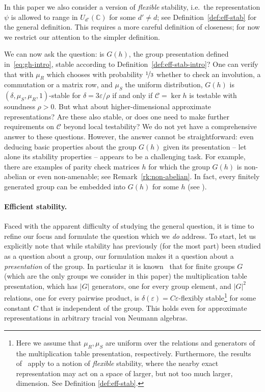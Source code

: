 \documentclass[11pt]{article}
\theoremstyle{definition}
\newcommand{\code}{\mathscr{C}}
\newcommand{\C}{\ensuremath{\mathbb{C}}}
\newcommand{\eps}{\varepsilon}
\begin{document}
In this paper we also consider a version of \emph{flexible} stability, i.e.\ the representation $\psi$ is allowed to range in $U_{d'}(\C)$ for some $d'\neq d$; see Definition~\ref{def:eff-stab} for the general definition. This requires a more careful definition of closeness; for now we restrict our attention to the simpler definition. %

We can now ask the question: is $G(h)$, the group presentation defined in~\eqref{eq:gh-intro}, stable according to Definition~\ref{def:eff-stab-intro}? 
One can verify that with $\mu_R$ which chooses with probability $\nicefrac{1}{3}$ whether to check an involution, a commutation or a matrix row,  and $\mu_S$ the uniform distribution, $G(h)$ is $(\delta,\mu_S,\mu_R,1)$-stable for $\delta=3\eps/\rho$ if and only if $\code = \ker h$ is testable with soundness $\rho>0$. But what about higher-dimensional approximate representations? Are these also stable, or does one need to make further requirements on $\code$ beyond local testability? We do not yet have a comprehensive answer to these questions. However, the answer cannot be straightforward: even deducing basic properties about the group $G(h)$ given its presentation -- let alone its stability properties -- appears to be a challenging task. For example, there are examples of parity check matrices $h$ for which the group $G(h)$ is non-abelian or even non-amenable; see Remark~\ref{rk:non-abelian}. In fact, every finitely generated group can be embedded into $G(h)$ for some $h$ (see \cite{slofstra2019set}).

\paragraph{Efficient stability.}
Faced with the apparent difficulty of studying the general question, it is time to refine our focus and formulate the question which we \emph{do} address. To start, let us explicitly note that 
while stability has previously (for the most part) been studied as a question about a group, our formulation makes it a question about a \emph{presentation} of the group. In particular it is known~\cite{gowers2017inverse,de2019operator} that for finite groups $G$ (which are the only groups we consider in this paper) the multiplication table presentation, which has $|G|$ generators, one  for every group element, and $|G|^2$ relations, one for every pairwise product, is $\delta(\eps)=C\eps$-flexibly stable\footnote{Here we assume that $\mu_R,\mu_S$ are uniform over the relations and generators of the multiplication table presentation, respectively. Furthermore, the results of~\cite{gowers2017inverse,de2019operator} apply to a notion of \emph{flexible} stability, where the nearby exact representation may act on a space of larger, but not too much larger, dimension. See  Definition \ref{def:eff-stab}.} for some constant $C$ that is independent of the group. This holds even for approximate representations in arbitrary tracial von Neumann algebras. 
\end{document}
